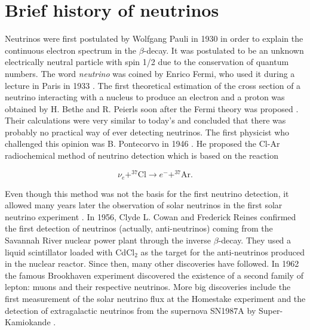 \section{Brief history of neutrinos}

Neutrinos were first postulated by Wolfgang Pauli in 1930 \cite{Pauli} in order to explain the continuous electron spectrum in the $\beta$-decay. It was postulated to be an unknown electrically neutral particle with spin 1/2 due to the conservation of quantum numbers. The word \textit{neutrino} was coined by Enrico Fermi, who used it during a lecture in Paris in 1933 \cite{FermiNeutrino}. The ﬁrst theoretical estimation of the cross section of a neutrino interacting with a nucleus to produce an electron and a proton was obtained by H. Bethe and R. Peierls soon after the Fermi theory was proposed \cite{bethe}. Their calculations were very similar to today's and concluded that there was probably no practical way of ever detecting neutrinos. The ﬁrst physicist who challenged this opinion was B. Pontecorvo in 1946 \cite{pontecorvo}. He proposed the Cl-Ar radiochemical method of neutrino detection which is based on the reaction

\begin{equation}
	\nu_e + ^{37}\mathrm{Cl} \rightarrow e^- + ^{37}\mathrm{Ar}.
\end{equation}

Even though this method was not the basis for the first neutrino detection, it allowed many years later the observation of solar neutrinos in the first solar neutrino experiment \cite{solarneutrinos}. In 1956, Clyde L. Cowan and Frederick Reines \cite{Clyde} confirmed the first detection of neutrinos (actually, anti-neutrinos) coming from the Savannah River nuclear power plant through the inverse $\beta$-decay. They used a liquid scintillator loaded with CdCl$_2$ as the target for the anti-neutrinos produced in the nuclear reactor. Since then, many other discoveries have followed. In 1962 the famous Brookhaven experiment discovered the existence of a second family of lepton: muons and their respective neutrinos. More big discoveries include the first measurement of the solar neutrino flux at the Homestake experiment \cite{solar} and the detection of extragalactic neutrinos from the supernova SN1987A by Super-Kamiokande \cite{galactic1}.

